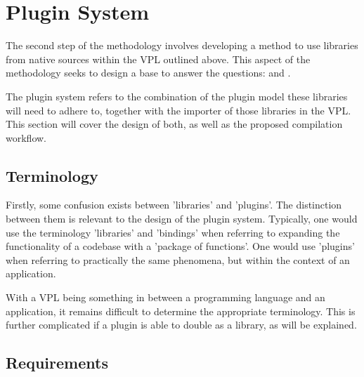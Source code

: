 \newpage
\section{Plugin System} 
\label{sec:method:plugin-system}

The second step of the methodology involves developing a method to use libraries from native sources within the VPL outlined above. 
This aspect of the methodology seeks to design a base to answer the questions: \mySubRQTwo and \mySubRQThree.

The plugin system refers to the combination of the plugin model these libraries will need to adhere to, together with the importer of those libraries in the VPL. 
This section will cover the design of both, as well as the proposed compilation workflow.


\subsection{Terminology}

Firstly, some confusion exists between 'libraries' and 'plugins'.
The distinction between them is relevant to the design of the plugin system. 
Typically, one would use the terminology 'libraries' and 'bindings' when referring to expanding the functionality of a codebase with a 'package of functions'.
One would use 'plugins' when referring to practically the same phenomena, but within the context of an application.

With a VPL being something in between a programming language and an application, it remains difficult to determine the appropriate terminology.  
This is further complicated if a plugin is able to double as a library, as will be explained.

\subsection{Requirements}

